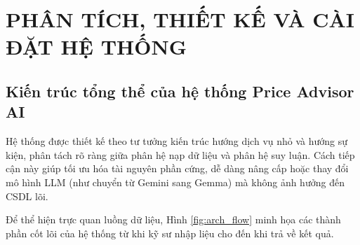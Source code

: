 \chapter{PHÂN TÍCH, THIẾT KẾ VÀ CÀI ĐẶT HỆ THỐNG}
\label{ch:chuong3}

\section{Kiến trúc tổng thể của hệ thống Price Advisor AI}
Hệ thống được thiết kế theo tư tưởng kiến trúc hướng dịch vụ nhỏ và hướng sự kiện, phân tách rõ ràng giữa phân hệ nạp dữ liệu và phân hệ suy luận. Cách tiếp cận này giúp tối ưu hóa tài nguyên phần cứng, dễ dàng nâng cấp hoặc thay đổi mô hình LLM (như chuyển từ Gemini sang Gemma) mà không ảnh hưởng đến CSDL lõi.

Để thể hiện trực quan luồng dữ liệu, Hình \ref{fig:arch_flow} minh họa các thành phần cốt lõi của hệ thống từ khi kỹ sư nhập liệu cho đến khi trả về kết quả.

